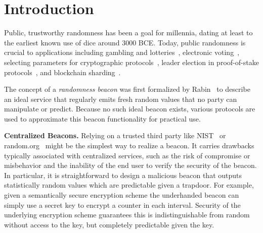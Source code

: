 
\section{Introduction}
\label{sec:intro}

Public, trustworthy randomness has been a goal for millennia, dating at least to the earliest known use of dice around 3000 BCE. Today, public randomness is crucial to applications including gambling and lotteries~\cite{bonneau2015bitcoin}, electronic voting~\cite{adida2008helios}, selecting parameters for cryptographic protocols~\cite{baigneres2015trap, lenstra2015random}, leader election in proof-of-stake protocols~\cite{gilad2017algorand, kiayias2017ouroboros}, and blockchain sharding~\cite{al2017chainspace, kokoris2018omniledger}.

The concept of a \emph{randomness beacon} was first formalized by Rabin~\cite{rabin1983Rabin} to describe an ideal service that regularly emits fresh random values that no party can manipulate or predict. Because no such ideal beacon exists, various protocols are used to approximate this beacon functionality for practical use.

\textbf{Centralized Beacons.} Relying on a trusted third party like NIST~\cite{fischer2011public,kelsey2019reference} or random.org~\cite{haahr2010random} might be the simplest way to realize a beacon. It carries drawbacks typically associated with centralized services, such as the risk of compromise or misbehavior and the inability of the end user to verify the security of the beacon.
In particular, it is straightforward to design a malicious beacon that outputs statistically random values which are predictable given a trapdoor. For example, given a semantically secure encryption scheme the underhanded beacon can simply use a secret key to encrypt a counter in each interval.
Security of the underlying encryption scheme guarantees this is indistinguishable from random without access to the key, but completely predictable given the key.


